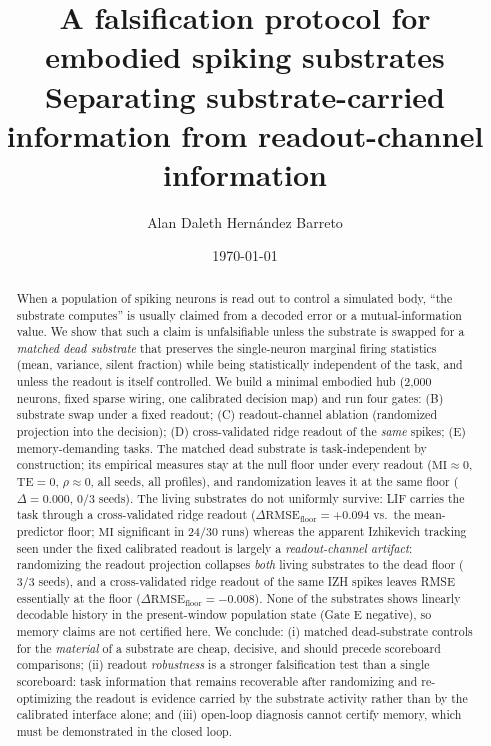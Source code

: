 \documentclass[10pt,a4paper]{article}
\title{\vspace{-1.5em}A falsification protocol for embodied spiking
substrates\\[0.3em]
{\large Separating substrate-carried information from readout-channel
information}\vspace{-0.5em}}
\author{Alan Daleth Hernández Barreto}
\date{\today}
\newcommand{\RMSE}{\ensuremath{\mathrm{RMSE}}}
\newcommand{\MI}{\ensuremath{\mathrm{MI}}}
\newcommand{\TE}{\ensuremath{\mathrm{TE}}}
\begin{document}
\maketitle
\vspace{-3em}

\begin{abstract}
\noindent
When a population of spiking neurons is read out to control a simulated
body, ``the substrate computes'' is usually claimed from a decoded
error or a mutual-information value. We show that such a claim is
unfalsifiable unless the substrate is swapped for a \emph{matched dead
substrate} that preserves the single-neuron marginal firing statistics
(mean, variance, silent fraction) while being statistically independent
of the task, and unless the readout is itself controlled. We build a
minimal embodied hub (2{,}000 neurons, fixed sparse wiring, one
calibrated decision map) and run four gates: (B) substrate swap under a
fixed readout; (C) readout-channel ablation (randomized projection into
the decision); (D) cross-validated ridge readout of the \emph{same}
spikes; (E) memory-demanding tasks. The matched dead substrate is
task-independent by construction; its empirical measures stay at the
null floor under every readout ($\MI\approx0$, $\TE=0$,
$\rho\approx0$, all seeds, all profiles), and randomization leaves it
at the same floor ($\Delta=0.000$, $0/3$ seeds). The living substrates
do not uniformly survive: LIF carries the task through a
cross-validated ridge readout ($\Delta\RMSE_{\mathrm{floor}}=+0.094$
vs.\ the mean-predictor floor; $\MI$ significant in $24/30$ runs)
whereas the apparent Izhikevich tracking seen under the fixed
calibrated readout is largely a \emph{readout-channel artifact}:
randomizing the readout projection collapses \emph{both} living
substrates to the dead floor ($3/3$ seeds), and a cross-validated ridge
readout of the same IZH spikes leaves RMSE essentially at the floor
($\Delta\RMSE_{\mathrm{floor}}=-0.008$). None of the substrates shows
linearly decodable history in the present-window population state
(Gate E negative), so memory claims are not certified here. We
conclude: (i) matched dead-substrate controls for the \emph{material}
of a substrate are cheap, decisive, and should precede scoreboard
comparisons; (ii) readout \emph{robustness} is a stronger falsification
test than a single scoreboard: task information that remains recoverable
after randomizing and re-optimizing the readout is evidence carried by
the substrate activity rather than by the calibrated interface alone;
and (iii) open-loop diagnosis cannot certify memory, which must be
demonstrated in the closed loop.
\end{abstract}
\end{document}
